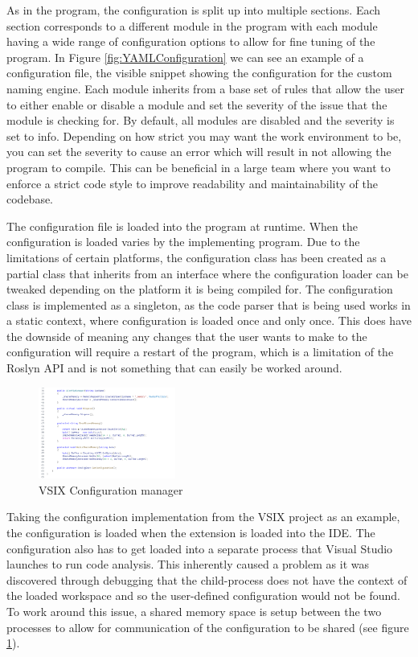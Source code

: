 As in the program, the configuration is split up into multiple sections. Each section corresponds to a different module in the program with each module having a wide range of configuration options to allow for fine tuning of the program. In Figure \ref{fig:YAMLConfiguration} we can see an example of a configuration file, the visible snippet showing the configuration for the custom naming engine. Each module inherits from a base set of rules that allow the user to either enable or disable a module and set the severity of the issue that the module is checking for. By default, all modules are disabled and the severity is set to info. Depending on how strict you may want the work environment to be, you can set the severity to cause an error which will result in not allowing the program to compile. This can be beneficial in a large team where you want to enforce a strict code style to improve readability and maintainability of the codebase.

The configuration file is loaded into the program at runtime. When the configuration is loaded varies by the implementing program. Due to the limitations of certain platforms, the configuration class has been created as a partial class that inherits from an interface where the configuration loader can be tweaked depending on the platform it is being compiled for. The configuration class is implemented as a singleton, as the code parser that is being used works in a static context, where configuration is loaded once and only once. This does have the downside of meaning any changes that the user wants to make to the configuration will require a restart of the program, which is a limitation of the Roslyn API and is not something that can easily be worked around.

\begin{figure}
    \centering
    \caption{VSIX Configuration manager}
    \label{fig:VSIXConfigurationManager}
    \includegraphics[width=0.4\textwidth]{Figures/VSIXAConfigManagerCropped.png}
\end{figure}

Taking the configuration implementation from the VSIX project as an example, the configuration is loaded when the extension is loaded into the IDE. The configuration also has to get loaded into a separate process that Visual Studio launches to run code analysis. This inherently caused a problem as it was discovered through debugging that the child-process does not have the context of the loaded workspace and so the user-defined configuration would not be found. To work around this issue, a shared memory space is setup between the two processes to allow for communication of the configuration to be shared (see figure \ref{fig:VSIXConfigurationManager}).
